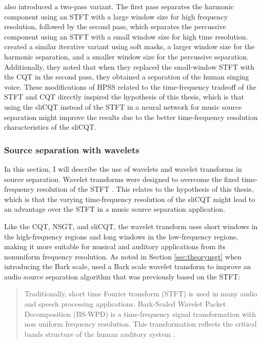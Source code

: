 \documentclass[report.tex]{subfiles}
\begin{document}
\textcite{driedger} also introduced a two-pass variant. The first pass separates the harmonic component using an STFT with a large window size for high frequency resolution, followed by the second pass, which separates the percussive component using an STFT with a small window size for high time resolution. \textcite{fitzgerald2} created a similar iterative variant using soft masks, a larger window size for the harmonic separation, and a smaller window size for the percussive separation. Additionally, they noted that when they replaced the small-window STFT with the CQT in the second pass, they obtained a separation of the human singing voice. These modifications of HPSS related to the time-frequency tradeoff of the STFT and CQT directly inspired the hypothesis of this thesis, which is that using the sliCQT instead of the STFT in a neural network for music source separation might improve the results due to the better time-frequency resolution characteristics of the sliCQT.

\subsubsection{Source separation with wavelets}
\label{sec:wavelets}

In this section, I will describe the use of wavelets and wavelet transforms in source separation. Wavelet transforms were designed to overcome the fixed time-frequency resolution of the STFT \parencite{wavelets1, wavelets2}. This relates to the hypothesis of this thesis, which is that the varying time-frequency resolution of the sliCQT might lead to an advantage over the STFT in a music source separation application.

Like the CQT, NSGT, and sliCQT, the wavelet transform uses short windows in the high-frequency regions and long windows in the low-frequency regions, making it more suitable for musical and auditory applications from its nonuniform frequency resolution. As noted in Section \ref{sec:theorynsgt} when introducing the Bark scale, \textcite{barkjust1} used a Bark scale wavelet transform to improve an audio source separation algorithm that was previously based on the STFT:

\begin{quote}
	Traditionally, short time Fourier transform (STFT) is used in many audio and speech processing applications. Bark-Scaled Wavelet Packet Decomposition (BS-WPD) is a time-frequency signal transformation with non uniform frequency resolution. This transformation reflects the critical bands structure of the human auditory system \parencite[1]{barkjust1}.
\end{quote}
\end{document}
